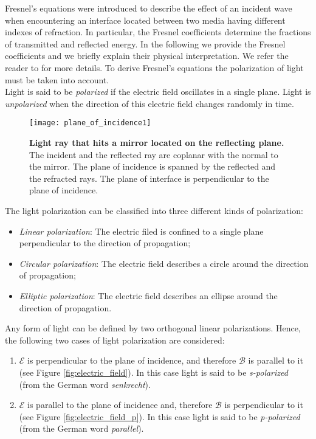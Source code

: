 \indent Fresnel's equations were introduced to describe the effect of an incident wave when encountering an interface located between two media having different indexes of refraction. In particular, the Fresnel coefficients determine the fractions of transmitted and reflected energy.  
In the following we provide the Fresnel coefficients and we briefly explain their physical interpretation. 
We refer the reader to \cite{hecht1998hecht, feynman2011feynman, born2013principles} for more details. To derive Fresnel's equations the polarization of light must be taken into account.
\\ \indent Light is said to be \textit{polarized} if the electric field oscillates in a single plane. Light is \textit{unpolarized} when the direction of this electric field changes randomly in time.
\begin{figure}[t]
 \label{fig:planeofincidence}
     \begin{center}
     \texttt{[image: plane\_of\_incidence1]}
     \end{center}
     \caption{\textbf{Light ray that hits a mirror located on the reflecting plane.} The incident and the reflected ray are coplanar with the normal to the mirror. The plane of incidence is spanned by the reflected and the refracted rays. The plane of interface is perpendicular to the plane of incidence.}
\label{fig:planeofincidence}
 \end{figure}
The light polarization can be classified into three different kinds of polarization:
\begin{itemize}
\item \textit{Linear polarization}: The electric filed is confined to a single plane perpendicular to the direction of propagation;
\item \textit{Circular polarization}: The electric field describes a circle around the direction of propagation;
\item \textit{Elliptic polarization}: The electric field describes an ellipse around the direction of propagation.
\end{itemize}
Any form of light can be defined by two orthogonal linear polarizations.
Hence, the following two cases of light polarization are considered: 
\begin{enumerate}
\item $\boldsymbol{\mathcal{E}}$ is perpendicular to the plane of incidence, and therefore $\boldsymbol{\mathcal{B}}$ is parallel to it (see Figure \ref{fig:electric_field}). In this case light is said to be \textit{s-polarized} (from the German word \textit{senkrecht}).
\item $\boldsymbol{\mathcal{E}}$ is parallel to the plane of incidence and, therefore $\boldsymbol{\mathcal{B}}$ is perpendicular to it (see Figure \ref{fig:electric_field_p}). In this case light is said to be \textit{p-polarized} (from the German word \textit{parallel}).
\end{enumerate}
